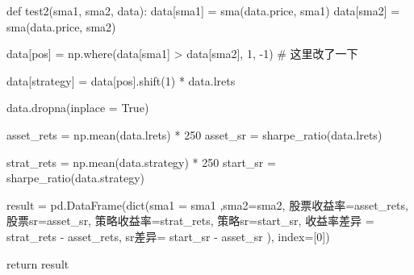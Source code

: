 \documentclass[
  letterpaper,
  DIV=11,
  numbers=noendperiod]{scrreprt}
\newenvironment{Shaded}{\begin{snugshade}}{\end{snugshade}}
\newcommand{\BuiltInTok}[1]{\textcolor[rgb]{0.00,0.23,0.31}{#1}}
\newcommand{\CommentTok}[1]{\textcolor[rgb]{0.37,0.37,0.37}{#1}}
\newcommand{\ControlFlowTok}[1]{\textcolor[rgb]{0.00,0.23,0.31}{#1}}
\newcommand{\DecValTok}[1]{\textcolor[rgb]{0.68,0.00,0.00}{#1}}
\newcommand{\KeywordTok}[1]{\textcolor[rgb]{0.00,0.23,0.31}{#1}}
\newcommand{\NormalTok}[1]{\textcolor[rgb]{0.00,0.23,0.31}{#1}}
\newcommand{\OperatorTok}[1]{\textcolor[rgb]{0.37,0.37,0.37}{#1}}
\newcommand{\StringTok}[1]{\textcolor[rgb]{0.13,0.47,0.30}{#1}}
\newcommand{\VariableTok}[1]{\textcolor[rgb]{0.07,0.07,0.07}{#1}}
\begin{document}
\begin{Shaded}
\begin{Highlighting}[]
\KeywordTok{def}\NormalTok{ test2(sma1, sma2, data):}
\NormalTok{    data[}\StringTok{\textquotesingle{}sma1\textquotesingle{}}\NormalTok{] }\OperatorTok{=}\NormalTok{ sma(data.price, sma1)}
\NormalTok{    data[}\StringTok{\textquotesingle{}sma2\textquotesingle{}}\NormalTok{] }\OperatorTok{=}\NormalTok{ sma(data.price, sma2)}

\NormalTok{    data[}\StringTok{\textquotesingle{}pos\textquotesingle{}}\NormalTok{] }\OperatorTok{=}\NormalTok{ np.where(data[}\StringTok{\textquotesingle{}sma1\textquotesingle{}}\NormalTok{] }\OperatorTok{\textgreater{}}\NormalTok{ data[}\StringTok{\textquotesingle{}sma2\textquotesingle{}}\NormalTok{], }\DecValTok{1}\NormalTok{, }\OperatorTok{{-}}\DecValTok{1}\NormalTok{) }\CommentTok{\# 这里改了一下}

\NormalTok{    data[}\StringTok{\textquotesingle{}strategy\textquotesingle{}}\NormalTok{] }\OperatorTok{=}\NormalTok{ data[}\StringTok{\textquotesingle{}pos\textquotesingle{}}\NormalTok{].shift(}\DecValTok{1}\NormalTok{) }\OperatorTok{*}\NormalTok{ data.lrets}

\NormalTok{    data.dropna(inplace }\OperatorTok{=} \VariableTok{True}\NormalTok{)}

\NormalTok{    asset\_rets }\OperatorTok{=}\NormalTok{ np.mean(data.lrets) }\OperatorTok{*} \DecValTok{250}
\NormalTok{    asset\_sr }\OperatorTok{=}\NormalTok{ sharpe\_ratio(data.lrets)}

\NormalTok{    strat\_rets }\OperatorTok{=}\NormalTok{ np.mean(data.strategy) }\OperatorTok{*} \DecValTok{250}
\NormalTok{    start\_sr }\OperatorTok{=}\NormalTok{ sharpe\_ratio(data.strategy)}

\NormalTok{    result }\OperatorTok{=}\NormalTok{ pd.DataFrame(}\BuiltInTok{dict}\NormalTok{(sma1 }\OperatorTok{=}\NormalTok{ sma1 ,sma2}\OperatorTok{=}\NormalTok{sma2, 股票收益率}\OperatorTok{=}\NormalTok{asset\_rets,}
\NormalTok{                            股票sr}\OperatorTok{=}\NormalTok{asset\_sr,}
\NormalTok{                            策略收益率}\OperatorTok{=}\NormalTok{strat\_rets,}
\NormalTok{                            策略sr}\OperatorTok{=}\NormalTok{start\_sr,}
\NormalTok{                            收益率差异 }\OperatorTok{=}\NormalTok{ strat\_rets }\OperatorTok{{-}}\NormalTok{ asset\_rets,}
\NormalTok{                            sr差异}\OperatorTok{=}\NormalTok{ start\_sr }\OperatorTok{{-}}\NormalTok{ asset\_sr}
\NormalTok{                            ), index}\OperatorTok{=}\NormalTok{[}\DecValTok{0}\NormalTok{])}

    \ControlFlowTok{return}\NormalTok{ result}
\end{Highlighting}
\end{Shaded}
\end{document}
